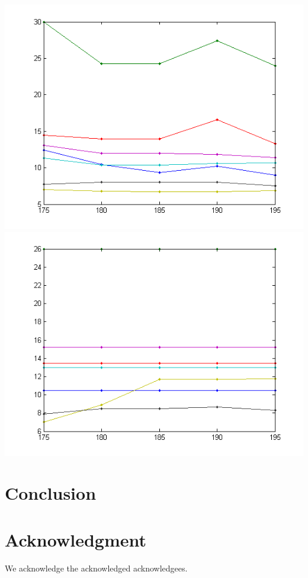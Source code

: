 \documentclass[conference]{IEEEtran}
\begin{document}
\includegraphics{s30}
\includegraphics{s35}


\section{Conclusion}

\section*{Acknowledgment}
We acknowledge the acknowledged acknowledgees.


\end{document}
